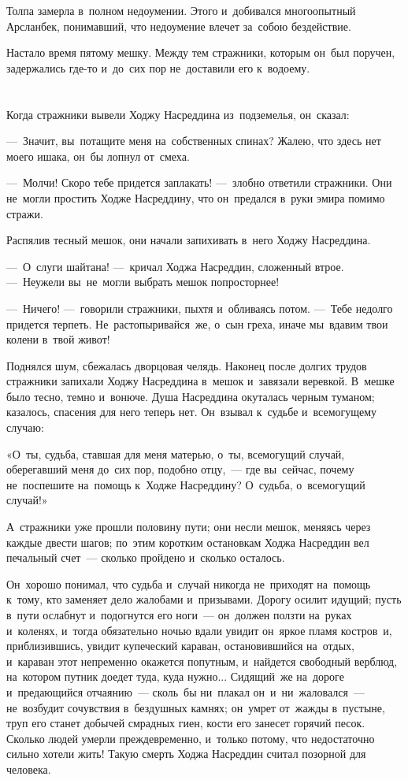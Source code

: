 \documentclass[12pt,a4paper]{book}
\begin{document}
Толпа замерла в~полном недоумении. Этого и~добивался многоопытный Арсланбек, понимавший, что недоумение влечет за~собою бездействие.

Настало время пятому мешку. Между тем стражники, которым он~был поручен, задержались где-то и~до~сих пор не~доставили его к~водоему.


\chapter{}

Когда стражники вывели Ходжу Насреддина из~подземелья, он~сказал:

—~Значит, вы~потащите меня на~собственных спинах? Жалею, что здесь нет моего ишака, он~бы лопнул от~смеха.

—~Молчи! Скоро тебе придется заплакать! —~злобно ответили стражники. Они не~могли простить Ходже Насреддину, что он~предался в~руки эмира помимо стражи.

Распялив тесный мешок, они начали запихивать в~него Ходжу Насреддина.

—~О~слуги шайтана! —~кричал Ходжа Насреддин, сложенный втрое. —~Неужели вы~не~могли выбрать мешок попросторнее!

—~Ничего! —~говорили стражники, пыхтя и~обливаясь потом. —~Тебе недолго придется терпеть. Не~растопыривайся~же, о~сын греха, иначе мы~вдавим твои колени в~твой живот!

Поднялся шум, сбежалась дворцовая челядь. Наконец после долгих трудов стражники запихали Ходжу Насреддина в~мешок и~завязали веревкой. В~мешке было тесно, темно и~вонюче. Душа Насреддина окуталась черным туманом; казалось, спасения для него теперь нет. Он~взывал к~судьбе и~всемогущему случаю:

«О~ты, судьба, ставшая для меня матерью, о~ты, всемогущий случай, оберегавший меня до~сих пор, подобно отцу,~— где вы~сейчас, почему не~поспешите на~помощь к~Ходже Насреддину? О~судьба, о~всемогущий случай!»

А~стражники уже прошли половину пути; они несли мешок, меняясь через каждые двести шагов; по~этим коротким остановкам Ходжа Насреддин вел печальный счет~— сколько пройдено и~сколько осталось.

Он~хорошо понимал, что судьба и~случай никогда не~приходят на~помощь к~тому, кто заменяет дело жалобами и~призывами. Дорогу осилит идущий; пусть в~пути ослабнут и~подогнутся его ноги~— он~должен ползти на~руках и~коленях, и~тогда обязательно ночью вдали увидит он~яркое пламя костров~и, приблизившись, увидит купеческий караван, остановившийся на~отдых, и~караван этот непременно окажется попутным, и~найдется свободный верблюд, на~котором путник доедет туда, куда нужно... Сидящий~же на~дороге и~предающийся отчаянию~— сколь~бы ни~плакал он~и~ни~жаловался~— не~возбудит сочувствия в~бездушных камнях; он~умрет от~жажды в~пустыне, труп его станет добычей смрадных гиен, кости его занесет горячий песок. Сколько людей умерли преждевременно, и~только потому, что недостаточно сильно хотели жить! Такую смерть Ходжа Насреддин считал позорной для человека.
\end{document}
